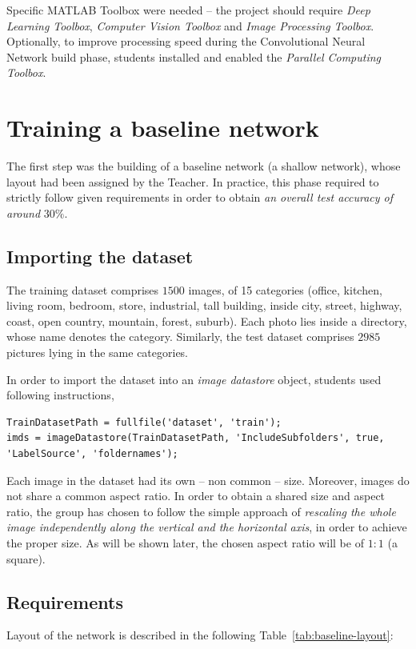 \documentclass[a4paper, 11pt]{article} %
\begin{document}
Specific MATLAB Toolbox were needed \--- the project should require \emph{Deep Learning Toolbox}, \emph{Computer Vision Toolbox} and \emph{Image Processing Toolbox}. Optionally, to improve processing speed during the Convolutional Neural Network build phase, students installed and enabled the \emph{Parallel Computing Toolbox}.






\section{Training a baseline network}\label{sec:baseline-network}

The first step was the building of a baseline network (a shallow network), whose layout had been assigned by the Teacher. In practice, this phase required to strictly follow given requirements in order to obtain \emph{an overall test accuracy of around} $30\%$.

\subsection{Importing the dataset} 

The training dataset comprises $1500$ images, of 15 categories (office, kitchen, living room, bedroom, store, industrial, tall building, inside city, street, highway, coast, open country, mountain, forest, suburb). Each photo lies inside a directory, whose name denotes the category. Similarly, the test dataset comprises $2985$ pictures lying in the same categories.

In order to import the dataset into an \emph{image datastore} object, students used following instructions,

\begin{lstlisting}
TrainDatasetPath = fullfile('dataset', 'train');
imds = imageDatastore(TrainDatasetPath, 'IncludeSubfolders', true, 'LabelSource', 'foldernames');
\end{lstlisting}

Each image in the dataset had its own \--- non common \--- size. Moreover, images do not share a common aspect ratio. In order to obtain a shared size and aspect ratio, the group has chosen to follow the simple approach of \emph{rescaling the whole image independently along the vertical and the horizontal axis}, in order to achieve the proper size. As will be shown later, the chosen aspect ratio will be of $1:1$ (a square).

\subsection{Requirements}
Layout of the network is described in the following Table~\ref{tab:baseline-layout}:
\bigskip
\end{document}
